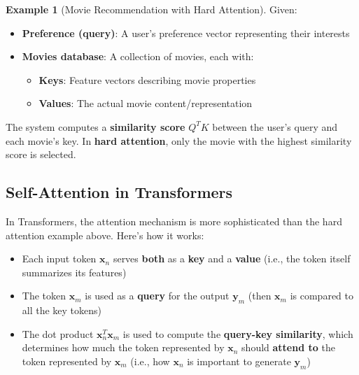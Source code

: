 \documentclass[11pt,a4paper]{article}
\theoremstyle{definition}
\newtheorem{example}{Example}[section]
\theoremstyle{plain}
\theoremstyle{remark}
\begin{document}
\begin{example}[Movie Recommendation with Hard Attention]
Given:
\begin{itemize}
    \item \textbf{Preference (query)}: A user's preference vector representing their interests
    \item \textbf{Movies database}: A collection of movies, each with:
    \begin{itemize}
        \item \textbf{Keys}: Feature vectors describing movie properties
        \item \textbf{Values}: The actual movie content/representation
    \end{itemize}
\end{itemize}

The system computes a \textbf{similarity score} $Q^TK$ between the user's query and each movie's key. In \textbf{hard attention}, only the movie with the highest similarity score is selected.
\end{example}

\subsection{Self-Attention in Transformers}

In Transformers, the attention mechanism is more sophisticated than the hard attention example above. Here's how it works:

\begin{tcolorbox}[colback=purple!10!white,colframe=purple!75!black,title=\textbf{Self-Attention: Key Concepts}]
\begin{itemize}
    \item Each input token $\mathbf{x}_n$ serves \textbf{both} as a \textbf{key} and a \textbf{value} (i.e., the token itself summarizes its features)
    
    \item The token $\mathbf{x}_m$ is used as a \textbf{query} for the output $\mathbf{y}_m$ (then $\mathbf{x}_m$ is compared to all the key tokens)
    
    \item The dot product $\mathbf{x}_n^T \mathbf{x}_m$ is used to compute the \textbf{query-key similarity}, which determines how much the token represented by $\mathbf{x}_n$ should \textbf{attend to} the token represented by $\mathbf{x}_m$ (i.e., how $\mathbf{x}_n$ is important to generate $\mathbf{y}_m$)
\end{itemize}
\end{tcolorbox}
\end{document}
